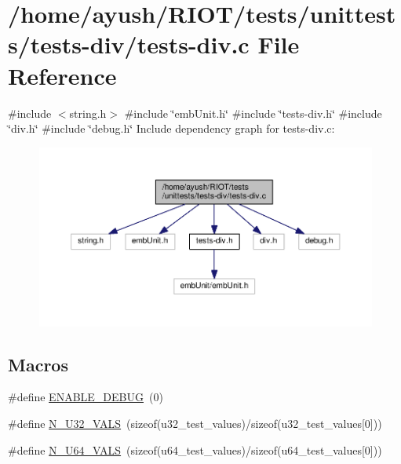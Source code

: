 \hypertarget{tests-div_8c}{}\section{/home/ayush/\+R\+I\+O\+T/tests/unittests/tests-\/div/tests-\/div.c File Reference}
\label{tests-div_8c}
{\ttfamily \#include $<$string.\+h$>$}\newline
{\ttfamily \#include \char`\"{}emb\+Unit.\+h\char`\"{}}\newline
{\ttfamily \#include \char`\"{}tests-\/div.\+h\char`\"{}}\newline
{\ttfamily \#include \char`\"{}div.\+h\char`\"{}}\newline
{\ttfamily \#include \char`\"{}debug.\+h\char`\"{}}\newline
Include dependency graph for tests-\/div.c\+:
\nopagebreak
\begin{figure}[H]
\begin{center}
\leavevmode
\includegraphics[width=350pt]{tests-div_8c__incl}
\end{center}
\end{figure}
\subsection*{Macros}
\begin{DoxyCompactItemize}
\item 
\#define \hyperlink{tests-div_8c_a432138093c53d7580af9ec5c5dca387f}{E\+N\+A\+B\+L\+E\+\_\+\+D\+E\+B\+UG}~(0)
\item 
\#define \hyperlink{tests-div_8c_ace6ba5e282a9a6e4eead9dfefbfe61f3}{N\+\_\+\+U32\+\_\+\+V\+A\+LS}~(sizeof(u32\+\_\+test\+\_\+values)/sizeof(u32\+\_\+test\+\_\+values\mbox{[}0\mbox{]}))
\item 
\#define \hyperlink{tests-div_8c_a683ece5f41556c48430405f7f05924d1}{N\+\_\+\+U64\+\_\+\+V\+A\+LS}~(sizeof(u64\+\_\+test\+\_\+values)/sizeof(u64\+\_\+test\+\_\+values\mbox{[}0\mbox{]}))
\end{DoxyCompactItemize}
